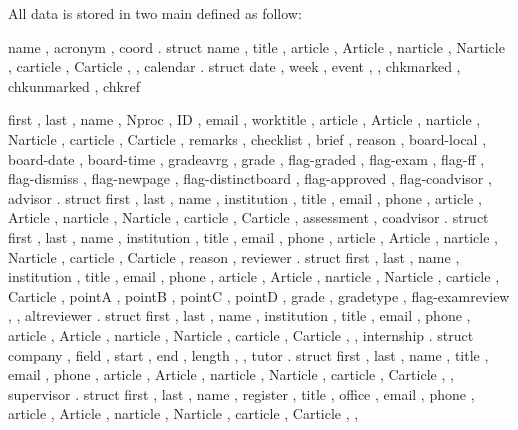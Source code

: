 \documentclass[article,nogeometry,english,tocdepth=3,secdepth=3]{ufrgscca} %
\begin{document}
All data is stored in two main  defined as follow:

\begin{codestore}[st=activitydef]
  {
    name , acronym ,
    coord . struct 
      {
        name , title ,
        article , Article , narticle , Narticle , carticle , Carticle ,
      } ,
    calendar . struct
      {
        date ,  week , event ,
      } ,
      chkmarked , chkunmarked , chkref
  }
\end{codestore}

\label{activity-def}


\begin{codestore}[st=studentdef]
 {
  first , last , name , Nproc , ID , email , worktitle ,
        article , Article , narticle , Narticle , carticle , Carticle ,
  remarks , checklist , brief , reason , 
  board-local , board-date , board-time , gradeavrg , grade ,
  flag-graded , %
  flag-exam ,
  flag-ff ,
  flag-dismiss , %
  flag-newpage , %
  flag-distinctboard , %
  flag-approved ,
  flag-coadvisor ,
  advisor . struct {
    first , last , name , institution , title , email , phone ,    
        article , Article , narticle , Narticle , carticle , Carticle ,
    assessment 
  } ,
  coadvisor . struct {
    first , last , name , institution , title , email , phone ,    
        article , Article , narticle , Narticle , carticle , Carticle ,
    reason 
  } ,
  reviewer . struct {
    first , last , name , institution , title , email , phone ,    
        article , Article , narticle , Narticle , carticle , Carticle ,
    pointA , pointB , pointC , pointD , grade , gradetype ,  flag-examreview ,  
  } ,
  altreviewer . struct {
    first , last , name , institution , title , email , phone ,    
        article , Article , narticle , Narticle , carticle , Carticle ,
  } ,
  internship . struct {
    company , field , start , end , length , 
  } ,
  tutor . struct {
    first , last , name , title , email , phone ,    
        article , Article , narticle , Narticle , carticle , Carticle ,
  } ,
  supervisor . struct {
    first , last , name , register , title , office , email , phone ,    
        article , Article , narticle , Narticle , carticle , Carticle ,
  } ,
 }
\end{codestore}
\end{document}

